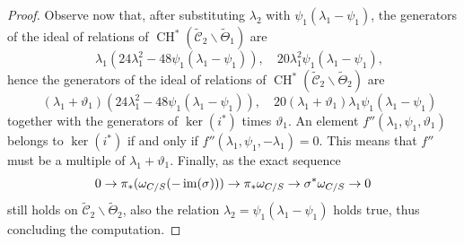 \documentclass[a4paper, 10pt]{amsart}
\numberwithin{equation}{section}
\numberwithin{subsection}{section}
\theoremstyle{definition}
\theoremstyle{remark}
\renewcommand{\mathcal}{\mathscr}
\newcommand\arr{\ifinner\to\else\longrightarrow\fi}
\newcommand\im[1]{\operatorname{im}(#1)}
\newcommand{\Ctilde}{\widetilde{\mathcal C}}
\newcommand{\ThTilde}{\widetilde{\Theta}}
\newcommand{\ch}[1][*]{\operatorname{CH}^{#1}}
\begin{document}
\begin{proof}
		Observe now that, after substituting $\lambda_2$ with $\psi_1(\lambda_1-\psi_1)$, the generators of the ideal of relations of $\ch(\Ctilde_2\smallsetminus\ThTilde_1)$ are
		\[ \quad \lambda_1(24\lambda_1^2-48\psi_1(\lambda_1-\psi_1)),\quad 20\lambda_1^2\psi_1(\lambda_1-\psi_1), \]
		hence the generators of the ideal of relations of $\ch(\Ctilde_2\smallsetminus\ThTilde_2)$ are
		\[ \quad (\lambda_1+\vartheta_1)(24\lambda_1^2-48\psi_1(\lambda_1-\psi_1)),\quad 20(\lambda_1+\vartheta_1)\lambda_1\psi_1(\lambda_1-\psi_1) \]
		together with the generators of $\ker(i^*)$ times $\vartheta_1$. An element $f''(\lambda_1,\psi_1,\vartheta_1)$ belongs to $\ker(i^*)$ if and only if $f''(\lambda_1,\psi_1,-\lambda_1)=0$. This means that $f''$ must be a multiple of $\lambda_1+\vartheta_1$.
		Finally, as the exact sequence 
		\[ 0 \arr \pi_*(\omega_{C/S}(-\im{\sigma})) \arr \pi_*\omega_{C/S} \arr \sigma^*\omega_{C/S} \arr 0 \]
		still holds on $\Ctilde_2\smallsetminus\ThTilde_2$, also the relation $\lambda_2=\psi_1(\lambda_1-\psi_1)$ holds true, thus concluding the computation.
	\end{proof}
\end{document}
